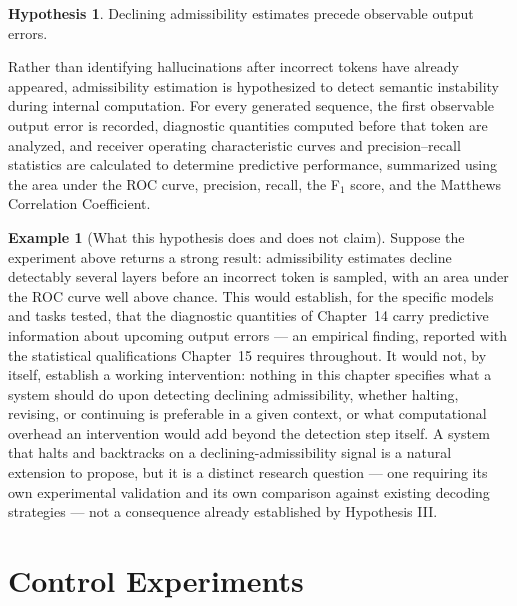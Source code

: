 \documentclass[11pt,twoside,openright]{book}
\numberwithin{equation}{chapter}
\theoremstyle{definition}
\newtheorem{example}[definition]{Example}
\theoremstyle{plain}
\theoremstyle{remark}
\theoremstyle{definition}
\newtheorem{hypothesis}[definition]{Hypothesis}
\begin{document}
\begin{hypothesis}
Declining admissibility estimates precede observable output errors.
\end{hypothesis}

Rather than identifying hallucinations after incorrect tokens have
already appeared, admissibility estimation is hypothesized to detect
semantic instability during internal computation. For every generated
sequence, the first observable output error is recorded, diagnostic
quantities computed before that token are analyzed, and receiver
operating characteristic curves and precision--recall statistics are
calculated to determine predictive performance, summarized using the
area under the ROC curve, precision, recall, the F$_1$ score, and the
Matthews Correlation Coefficient.

\begin{example}[What this hypothesis does and does not claim]
Suppose the experiment above returns a strong result: admissibility
estimates decline detectably several layers before an incorrect token is
sampled, with an area under the ROC curve well above chance. This would
establish, for the specific models and tasks tested, that the diagnostic
quantities of Chapter~14 carry predictive information about upcoming
output errors --- an empirical finding, reported with the statistical
qualifications Chapter~15 requires throughout. It would not, by itself,
establish a working intervention: nothing in this chapter specifies what
a system should do upon detecting declining admissibility, whether
halting, revising, or continuing is preferable in a given context, or
what computational overhead an intervention would add beyond the
detection step itself. A system that halts and backtracks on a
declining-admissibility signal is a natural extension to propose, but it
is a distinct research question --- one requiring its own experimental
validation and its own comparison against existing decoding strategies
--- not a consequence already established by Hypothesis III.
\end{example}

\section{Control Experiments}
\end{document}
